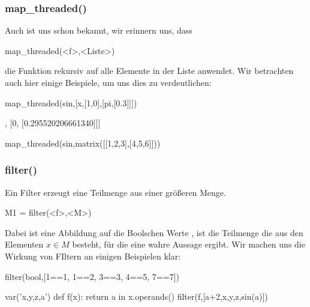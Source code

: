 \documentclass[fontsize=12pt,paper=a4,twoside,bibtotoc,idxtotoc,
liststotoc,pagesize,BCOR1.2cm,DIV15,chapterprefix,pagesize=pdftex]{scrbook}
\theoremstyle{plain}
\theoremstyle{definition}
\theoremstyle{remark}
\begin{document}
\subsubsection{map\_threaded()}
Auch  ist uns schon bekannt, wir erinnern uns, dass
\begin{sagein}
map_threaded(<f>,<Liste>)
\end{sagein}
die Funktion  rekursiv auf alle Elemente in der Liste  anwendet. Wir betrachten auch hier einige Beispiele, um uns dies zu verdeutlichen:
\begin{sagein}
map_threaded(sin,[x,[1,0],[pi,[0.3]]])
\end{sagein}
\begin{sageout}
[sin(x), [sin(1), 0], [0, [0.295520206661340]]]
\end{sageout}
\begin{sagein}
map_threaded(sin,matrix([[1,2,3],[4,5,6]]))
\end{sagein}
\begin{sageout}
\end{sageout}
\subsubsection{filter()}
Ein Filter erzeugt eine Teilmenge aus einer größeren Menge.
\begin{sagein}
M1 = filter(<f>,<M>)
\end{sagein}
Dabei ist  eine Abbildung auf die Boolschen Werte ,  ist die Teilmenge die aus den Elementen $x\in M$ besteht, für die  eine wahre Aussage
ergibt. 
Wir machen uns die Wirkung von FIltern an einigen Beispielen klar:
\begin{sagein}
 filter(bool,[1==1, 1==2, 3==3, 4==5, 7==7])
 \end{sagein}
 \begin{sageout}
 \end{sageout}
\begin{sagein}
var('x,y,z,a')
def f(x): return a in x.operands()
filter(f,[a+2,x,y,z,sin(a)])
\end{sagein}
\begin{sageout}
  [a + 2, sin(a)]
\end{sageout}
\end{document}
